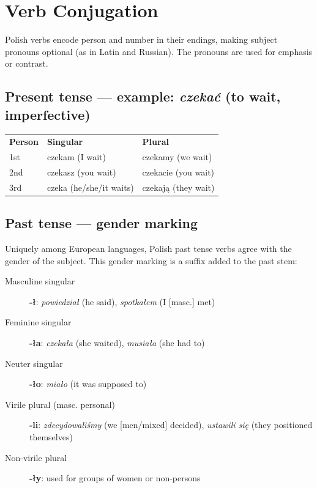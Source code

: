 \section{Verb Conjugation}

Polish verbs encode person and number in their endings, making subject 
pronouns optional (as in Latin and Russian). The pronouns are used 
for emphasis or contrast.

\subsection*{Present tense — example: \textit{czekać} (to wait, imperfective)}

\begin{tabular}{lll}
  \textbf{Person} & \textbf{Singular} & \textbf{Plural} \\
  1st & czekam (I wait) & czekamy (we wait) \\
  2nd & czekasz (you wait) & czekacie (you wait) \\
  3rd & czeka (he/she/it waits) & czekają (they wait) \\
\end{tabular}

\subsection*{Past tense — gender marking}

Uniquely among European languages, Polish past tense verbs agree with 
the gender of the subject. This gender marking is a suffix added to the 
past stem:

\begin{description}
  \item[Masculine singular] \textbf{-ł}: \textit{powiedział} (he said), 
    \textit{spotkałem} (I [masc.] met)
  \item[Feminine singular] \textbf{-ła}: \textit{czekała} (she waited), 
    \textit{musiała} (she had to)
  \item[Neuter singular] \textbf{-ło}: \textit{miało} (it was supposed to)
  \item[Virile plural (masc. personal)] \textbf{-li}: \textit{zdecydowaliśmy} 
    (we [men/mixed] decided), \textit{ustawili się} (they positioned themselves)
  \item[Non-virile plural] \textbf{-ły}: used for groups of women or non-persons
\end{description}

